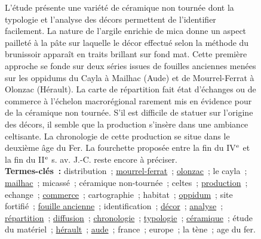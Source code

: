 \documentclass[10pt,twoside]{article}
\begin{document}
\begin{figure}
{{          L'étude présente une variété de céramique non tournée dont la
          typologie et l'analyse des décors permettent de l'identifier
          facilement. La nature de l'argile enrichie de mica donne un aspect
          pailleté à la pâte sur laquelle le décor effectué selon la méthode du
          brunissoir apparaît en traits brillant sur fond mat. Cette première
          approche se fonde sur deux séries issues de fouilles anciennes menées
          sur les oppidums du Cayla à Mailhac (Aude) et de Mourrel-Ferrat à
          Olonzac (Hérault). La carte de répartition fait état d'échanges ou de
          commerce à l'échelon macrorégional rarement mis en évidence pour de la
          céramique non tournée. S'il est difficile de statuer sur l'origine des
          décors, il semble que la production s'insère dans une ambiance
          celtisante. La chronologie de cette production se situe dans le
          deuxième âge du Fer. La fourchette proposée entre la fin du
          IV$^\textnormal{e}$ et la fin du II$^\textnormal{e}$ s. av. J.-C. reste encore à
          préciser.\\

          \textbf{Termes-clés~:} distribution~; \underline{mourrel-ferrat}~;
          \underline{olonzac}~; le cayla~; \underline{mailhac}~; micassé~;
          céramique non-tournée~; celtes~; \underline{production}~; echange~;
          \underline{commerce}~; cartographie~; habitat~; \underline{oppidum}~;
          site fortifié~; \underline{fouille ancienne}~; identification~;
          \underline{décor}~; \underline{analyse}~; \underline{répartition}~;
          \underline{diffusion}~; \underline{chronologie}~;
          \underline{typologie}~; \underline{céramique}~; étude du matériel~;
          \underline{hérault}~; \underline{aude}~; france~; europe~; la tène~;
          age du fer.
        }
      }
       ~\\~\\
\end{figure}
\end{document}
